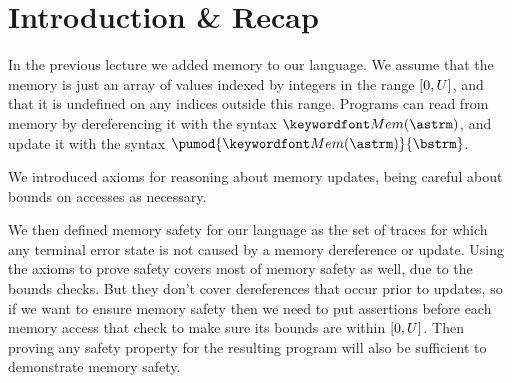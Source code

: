 \documentclass[11pt,twoside]{scrartcl}
\begin{document}
\newcommand{\atrace}{\sigma}%
\newcommand{\stdI}{\dTLint[state=\omega]}%
\newcommand{\Ip}{\dTLint[trace=\atrace]}%
\newcommand{\ws}{\omega}\newcommand{\wt}{\nu}%

\maketitle
\thispagestyle{empty}


\section{Introduction \& Recap}

In the previous lecture we added memory to our language. We assume that the memory is just an array of values indexed by integers in the range $[0,U]$, and that it is undefined on any indices outside this range. Programs can read from memory by dereferencing it with the syntax $\pderef{\astrm}$, and update it with the syntax $\pumod{\pderef{\astrm}}{\bstrm}$.

We introduced axioms for reasoning about memory updates, being careful about bounds on accesses as necessary.
\begin{center}
\begin{calculus}
{
  {}
}{}%

{
  {}
}{}%
{
  {}
}{}%
\end{calculus}
\end{center}
We then defined memory safety for our language as the set of traces for which any terminal error state \errstate is not caused by a memory dereference or update. Using the axioms to prove safety covers most of memory safety as well, due to the bounds checks. But they don't cover dereferences that occur prior to updates, so if we want to ensure memory safety then we need to put assertions before each memory access that check to make sure its bounds are within $[0,U]$. Then proving any safety property for the resulting program will also be sufficient to demonstrate memory safety.
\end{document}
